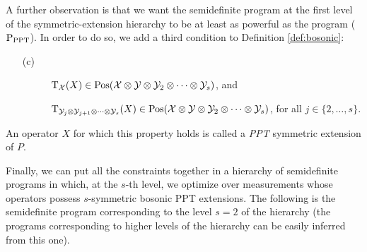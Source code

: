 A further observation is that we want the semidefinite program at the first level 
of the symmetric-extension hierarchy to be at least as powerful as the program 
($\textup{P}_{\mathrm{PPT}}$). In order to do so, we add a third condition to Definition 
\ref{def:bosonic}:
  \begin{itemize}
    \item[(c)] 
      \begin{description}
        \item[] $\operatorname{T}_{\mathcal{X}}(X) \in \mathrm{Pos}(\mathcal{X}\otimes\mathcal{Y}\otimes\mathcal{Y}_{2}\otimes\cdots\otimes\mathcal{Y}_{s})$, and
        \item[] $\operatorname{T}_{\mathcal{Y}_{j}\otimes\mathcal{Y}_{j+1}\otimes\cdots\otimes\mathcal{Y}_{s}}(X) \in 
      \mathrm{Pos}(\mathcal{X}\otimes\mathcal{Y}\otimes\mathcal{Y}_{2}\otimes\cdots\otimes\mathcal{Y}_{s})$, 
      for all $j \in \{2, \ldots, s\}$.
      \end{description}
  \end{itemize}
An operator $X$ for which this property holds is called a \emph{PPT} symmetric
extension of $P$.

Finally, we can put all the constraints together in a hierarchy of semidefinite programs 
in which, at the $s$-th level, we optimize over measurements whose operators possess 
$s$-symmetric bosonic PPT extensions. 
The following is the semidefinite program corresponding to the level $s = 2$ of 
the hierarchy (the programs corresponding to higher levels of the hierarchy can 
be easily inferred from this one).

